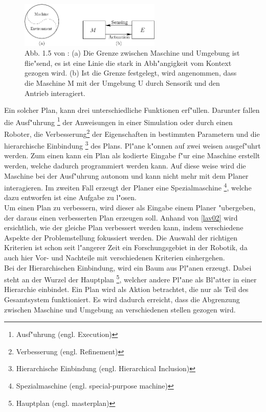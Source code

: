 \begin{figure} %
	\centering
	\includegraphics[width=0.6\textwidth]{images/img224.png}
	\caption{Abb. 1.5 von \cite[~S. 20]{Lav06}:  (a) Die Grenze zwischen Maschine und Umgebung ist flie"send, es ist eine Linie die stark in Abh"angigkeit vom Kontext gezogen wird. (b) Ist die Grenze festgelegt, wird angenommen, dass die Maschine M mit der Umgebung U durch Sensorik und den Antrieb interagiert.}
	\label{lav01}
\end{figure}
 



Ein solcher Plan, kann drei unterschiedliche Funktionen erf"ullen. Darunter fallen die Ausf"uhrung \footnote{Ausf"uhrung (engl. Execution)} der Anweisungen in einer Simulation oder durch einen Roboter, die Verbesserung\footnote{Verbesserung (engl. Refinement)} der Eigenschaften in bestimmten Parametern und die hierarchische Einbindung \footnote{Hierarchische Einbindung (engl. Hierarchical Inclusion)} des Plans.
Pl"ane k"onnen auf zwei weisen ausgef"uhrt werden. Zum einen kann ein Plan als kodierte Eingabe f"ur eine Maschine erstellt werden, welche dadurch programmiert werden kann. Auf diese weise wird die Maschine bei der Ausf"uhrung autonom und kann nicht mehr mit dem Planer interagieren. 
Im zweiten Fall erzeugt der Planer eine Spezialmaschine \footnote{Spezialmaschine (engl. special-purpose machine)}, welche dazu entworfen ist eine Aufgabe zu l"osen.
\newline\\
Um einen Plan zu verbessern, wird dieser als Eingabe einem Planer "ubergeben, der daraus einen verbesserten Plan erzeugen soll. 
Anhand von \ref{lav02} wird ersichtlich, wie der gleiche Plan verbessert werden kann, indem verschiedene Aspekte der Problemstellung fokussiert werden.
Die Auswahl der richtigen Kriterien ist schon seit l"angerer Zeit ein Forschungsgebiet in der Robotik, da auch hier Vor- und Nachteile mit verschiedenen Kriterien einhergehen.
\newline\\
Bei der Hierarchischen Einbindung, wird ein Baum aus Pl"anen erzeugt. Dabei steht an der Wurzel der Hauptplan \footnote{Hauptplan (engl. masterplan)}, welcher andere Pl"ane als Bl"atter in einer Hierarchie einbindet. Ein Plan wird als Aktion betrachtet, die nur als Teil des Gesamtsystem funktioniert. Es wird dadurch erreicht, dass die Abgrenzung zwischen Maschine und Umgebung an verschiedenen stellen gezogen wird.
\newline\cite[~S. 21ff]{Lav06} 

